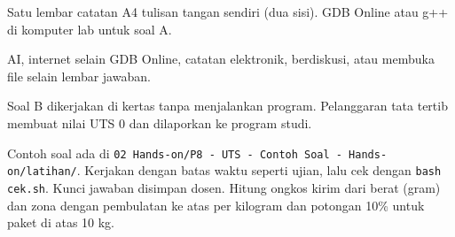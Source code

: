 \documentclass[a4paper]{article}
\begin{document}
\par\vspace{4pt}\par\vspace{6pt}
\begin{Jawaban}
Satu lembar catatan A4 tulisan tangan sendiri (dua sisi). GDB Online atau g++ di komputer lab untuk soal A.
\end{Jawaban}
\begin{Tebak}
AI, internet selain GDB Online, catatan elektronik, berdiskusi, atau membuka file selain lembar jawaban.
\end{Tebak}
\begin{Penting}[]
Soal B dikerjakan di kertas tanpa menjalankan program. Pelanggaran tata tertib membuat nilai UTS 0 dan dilaporkan ke program studi.
\end{Penting}
Contoh soal ada di \texttt{02 Hands-on/P8 - UTS - Contoh Soal - Hands-on/latihan/}. Kerjakan dengan batas waktu seperti ujian, lalu cek dengan \texttt{bash cek.sh}. Kunci jawaban disimpan dosen.
Hitung ongkos kirim dari berat (gram) dan zona dengan pembulatan ke atas per kilogram dan potongan 10\% untuk paket di atas 10 kg.
\end{document}
